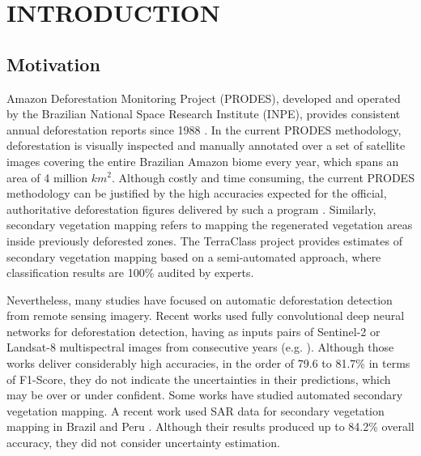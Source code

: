 \chapter{INTRODUCTION}

\section{Motivation}
 Amazon Deforestation Monitoring Project (PRODES), developed and operated by the Brazilian National Space Research Institute (INPE), provides consistent annual deforestation reports since 1988 \cite{prodes}. In the current PRODES methodology, deforestation is visually inspected and manually annotated over a set of satellite images covering the entire Brazilian Amazon biome every year, which spans an area of 4 million $km^2$. Although costly and time consuming, the current PRODES methodology can be justified by the high accuracies expected for the official, authoritative deforestation figures delivered by such a program \cite{prodes,laurance2002predictors}. Similarly, secondary vegetation mapping refers to mapping the regenerated vegetation areas inside previously deforested zones. The TerraClass project \cite{almeida2016high} provides estimates of secondary vegetation mapping based on a semi-automated approach, where classification results are 100\% audited by experts.


Nevertheless, many studies have focused on automatic deforestation detection from remote sensing imagery. Recent works used fully convolutional deep neural networks for deforestation detection, having as inputs pairs of Sentinel-2 or Landsat-8 multispectral images from consecutive years (e.g. \cite{ortega2021comparison, adarme2022multi, torres2021deforestation}). Although those works deliver considerably high accuracies, in the order of 79.6 to 81.7\% in terms of F1-Score, they do not indicate the uncertainties in their  predictions, which may be over or under confident. Some works have studied automated secondary vegetation mapping. A recent work used SAR data for secondary vegetation mapping in Brazil and Peru \cite{kiyohara2022mapping}. Although their results produced up to 84.2\% overall accuracy, they did not consider uncertainty estimation.


